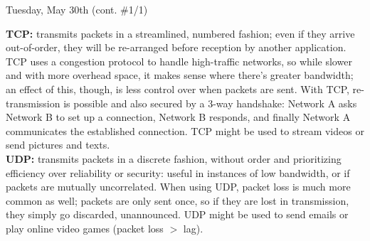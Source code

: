 \documentclass[11pt]{article}
\begin{document}
\begin{bloodorangebox}{Tuesday, May 30th \hspace{0.2cm}(cont. \#1/1)\vspace{-2.2em}\begin{flushright}\large{}\end{flushright}}
\begin{multicols}{2}
        \vfill
        \columnbreak
        \scriptsize\textbf{TCP:} transmits packets in a streamlined, numbered fashion; even if they arrive out-of-order, they will be re-arranged before reception by another application. TCP uses a congestion protocol to handle high-traffic networks, so while slower and with more overhead space, it makes sense where there's greater bandwidth; an effect of this, though, is less control over when packets are sent. With TCP, re-transmission is possible and also secured by a 3-way handshake: Network A asks Network B to set up a connection, Network B responds, and finally Network A communicates the established connection. TCP might be used to stream videos or send pictures and texts. \\
        \hline
        \vspace{0.75em}
        \scriptsize\textbf{UDP:} transmits packets in a discrete fashion, without order and prioritizing efficiency over reliability or security: useful in instances of low bandwidth, or if packets are mutually uncorrelated. When using UDP, packet loss is much more common as well; packets are only sent once, so if they are lost in transmission, they simply go discarded, unannounced. UDP might be used to send emails or play online video games (packet loss $>$ lag).
    \end{multicols}
\end{bloodorangebox}

\begin{center}
    \hspace{0.2cm}
    \vspace{-0.5em}
\end{center}
\end{document}
